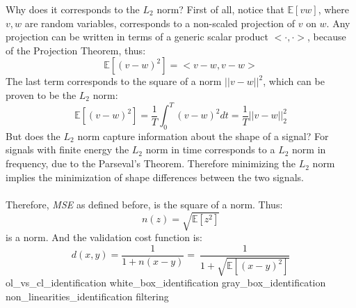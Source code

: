 Why does it corresponds to the $L_2$ norm? First of all, notice that $\mathbb{E}[vw]$, where $v,w$ are random variables, corresponds to a non-scaled projection of $v$ on $w$. Any projection can be written in terms of a generic scalar product $<\cdot,\cdot>$, because of the Projection Theorem,  thus:
\begin{equation}\mathbb{E}[(v-w)^2] = <v-w,v-w>\end{equation}
The last term corresponds to the square of a norm $||v-w||^2$, which can be proven to be the $L_2$ norm:
\begin{equation}\mathbb{E}[(v-w)^2]  = \frac{1}{T} \int_0^T (v-w)^2 dt = \frac{1}{T} ||v-w||_2^2 \end{equation}
But does the $L_2$ norm capture information about the shape of a signal? For signals with finite energy the $L_2$ norm in time corresponds to a $L_2$ norm in frequency, due to the Parseval's Theorem. Therefore minimizing the $L_2$ norm implies the minimization of shape differences between the two signals.
\\ \\
Therefore, \emph{MSE} as defined before, is the square of a norm. Thus:
\begin{equation}n(z) = \sqrt{\mathbb{E}[z^2]}\end{equation}
is a norm.
And the validation cost function is:
\begin{equation}d(x,y)= \frac{1}{1+n(x-y)}=\ \frac{1}{1+\sqrt{\mathbb{E}[(x-y)^2]}}\end{equation}
{ol_vs_cl_identification}
{white_box_identification}
{gray_box_identification}
{non_linearities_identification}
{filtering}